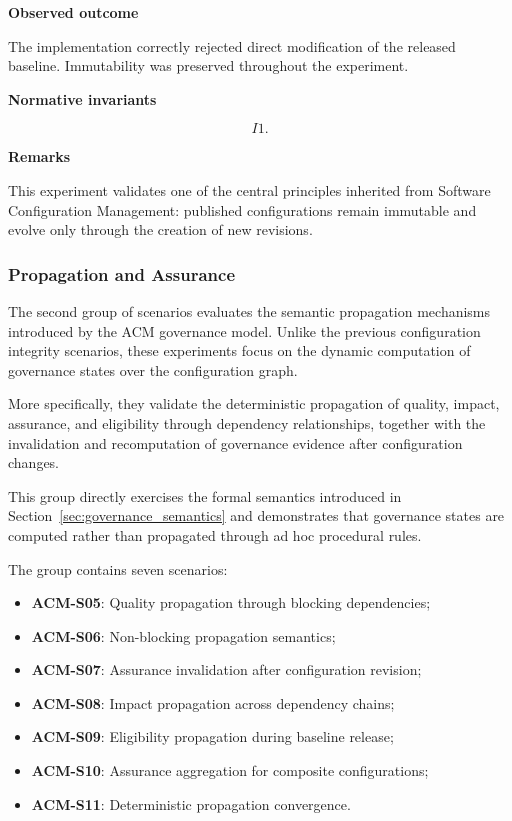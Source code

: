 \documentclass[10pt]{article}
\begin{document}
\textbf{Observed outcome}

The implementation correctly rejected direct modification of the released
baseline.
Immutability was preserved throughout the experiment.

\textbf{Normative invariants}

\[
I1.
\]

\textbf{Remarks}

This experiment validates one of the central principles inherited from Software
Configuration Management: published configurations remain immutable and evolve
only through the creation of new revisions.
\subsubsection{Propagation and Assurance}
\label{app:scenario_group_b}

The second group of scenarios evaluates the semantic propagation mechanisms
introduced by the ACM governance model. Unlike the previous configuration
integrity scenarios, these experiments focus on the dynamic computation of
governance states over the configuration graph.

More specifically, they validate the deterministic propagation of quality,
impact, assurance, and eligibility through dependency relationships, together
with the invalidation and recomputation of governance evidence after
configuration changes.

This group directly exercises the formal semantics introduced in
Section~\ref{sec:governance_semantics} and demonstrates that governance states
are computed rather than propagated through ad hoc procedural rules.

The group contains seven scenarios:

\begin{itemize}
    \item \textbf{ACM-S05}: Quality propagation through blocking dependencies;
    \item \textbf{ACM-S06}: Non-blocking propagation semantics;
    \item \textbf{ACM-S07}: Assurance invalidation after configuration revision;
    \item \textbf{ACM-S08}: Impact propagation across dependency chains;
    \item \textbf{ACM-S09}: Eligibility propagation during baseline release;
    \item \textbf{ACM-S10}: Assurance aggregation for composite configurations;
    \item \textbf{ACM-S11}: Deterministic propagation convergence.
\end{itemize}
\end{document}
